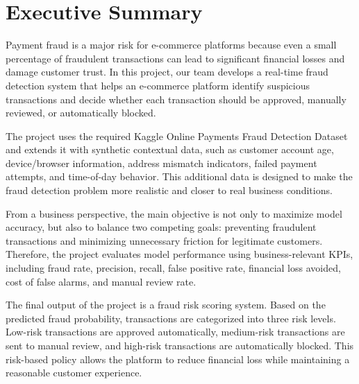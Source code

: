 \section{Executive Summary}
Payment fraud is a major risk for e-commerce platforms because even a small percentage of fraudulent transactions can lead to significant financial losses and damage customer trust. In this project, our team develops a real-time fraud detection system that helps an e-commerce platform identify suspicious transactions and decide whether each transaction should be approved, manually reviewed, or automatically blocked.

The project uses the required Kaggle Online Payments Fraud Detection Dataset and extends it with synthetic contextual data, such as customer account age, device/browser information, address mismatch indicators, failed payment attempts, and time-of-day behavior. This additional data is designed to make the fraud detection problem more realistic and closer to real business conditions.

From a business perspective, the main objective is not only to maximize model accuracy, but also to balance two competing goals: preventing fraudulent transactions and minimizing unnecessary friction for legitimate customers. Therefore, the project evaluates model performance using business-relevant KPIs, including fraud rate, precision, recall, false positive rate, financial loss avoided, cost of false alarms, and manual review rate.

The final output of the project is a fraud risk scoring system. Based on the predicted fraud probability, transactions are categorized into three risk levels. Low-risk transactions are approved automatically, medium-risk transactions are sent to manual review, and high-risk transactions are automatically blocked. This risk-based policy allows the platform to reduce financial loss while maintaining a reasonable customer experience.